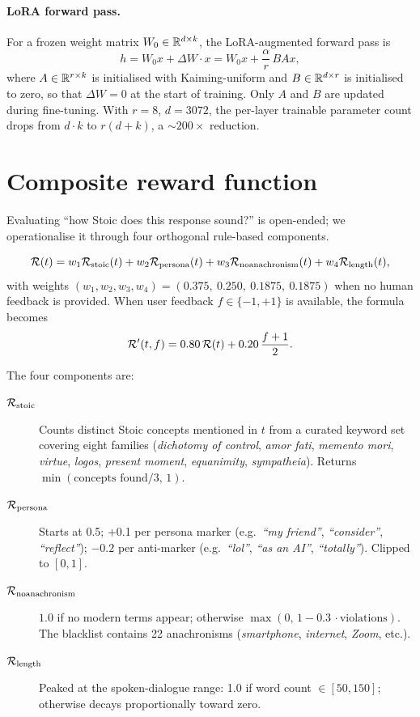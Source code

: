 \documentclass{ecsproject}
\begin{document}
\paragraph{LoRA forward pass.}
For a frozen weight matrix $W_0 \in \mathbb{R}^{d \times k}$, the LoRA-augmented
forward pass is
\begin{equation}
h = W_0 x + \Delta W \cdot x
  = W_0 x + \frac{\alpha}{r}\, B A x,
\label{eq:lora}
\end{equation}
where $A \in \mathbb{R}^{r \times k}$ is initialised with Kaiming-uniform and
$B \in \mathbb{R}^{d \times r}$ is initialised to zero, so that
$\Delta W = 0$ at the start of training. Only $A$ and $B$ are updated
during fine-tuning. With $r=8$, $d=3072$, the per-layer trainable
parameter count drops from $d \cdot k$ to $r(d+k)$, a $\sim\!200\times$
reduction.

\section{Composite reward function} \label{sec:reward}
Evaluating ``how Stoic does this response sound?'' is open-ended; we
operationalise it through four orthogonal rule-based components.

\begin{equation}
\mathcal{R}(t) = w_1 \mathcal{R}_{\text{stoic}}(t) + w_2 \mathcal{R}_{\text{persona}}(t)
           + w_3 \mathcal{R}_{\text{noanachronism}}(t) + w_4 \mathcal{R}_{\text{length}}(t),
\label{eq:reward}
\end{equation}
with weights $(w_1, w_2, w_3, w_4) = (0.375,\ 0.250,\ 0.1875,\ 0.1875)$
when no human feedback is provided. When user feedback $f \in \{-1, +1\}$
is available, the formula becomes
\begin{equation}
\mathcal{R}'(t, f) = 0.80\, \mathcal{R}(t) + 0.20\, \frac{f+1}{2}.
\end{equation}

The four components are:
\begin{description}
    \item[$\mathcal{R}_{\text{stoic}}$] Counts distinct Stoic concepts mentioned
    in $t$ from a curated keyword set covering eight families
    (\emph{dichotomy of control}, \emph{amor fati}, \emph{memento mori},
    \emph{virtue}, \emph{logos}, \emph{present moment},
    \emph{equanimity}, \emph{sympatheia}). Returns
    $\min(\text{concepts found}/3,\,1)$.
    \item[$\mathcal{R}_{\text{persona}}$] Starts at 0.5;
    +0.1 per persona marker (e.g.\ \emph{``my friend''},
    \emph{``consider''}, \emph{``reflect''}); $-0.2$ per anti-marker
    (e.g.\ \emph{``lol''}, \emph{``as an AI''}, \emph{``totally''}).
    Clipped to $[0, 1]$.
    \item[$\mathcal{R}_{\text{noanachronism}}$] $1.0$ if no modern terms
    appear; otherwise $\max(0,\,1 - 0.3\,\cdot\!\text{violations})$.
    The blacklist contains 22 anachronisms (\emph{smartphone},
    \emph{internet}, \emph{Zoom}, etc.).
    \item[$\mathcal{R}_{\text{length}}$] Peaked at the spoken-dialogue
    range: 1.0 if word count $\in [50, 150]$; otherwise decays
    proportionally toward zero.
\end{description}
\end{document}
